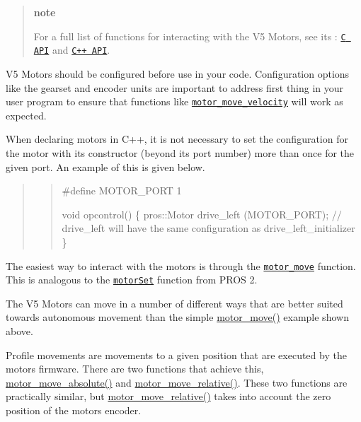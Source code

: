 \begin{quote}
{\bfseries note}

For a full list of functions for interacting with the V5 Motors, see its \+: \href{../../api/c/motors.html}{\tt C A\+PI} and \href{../../api/cpp/motors.html}{\tt C++ A\+PI}.

\end{quote}


V5 Motors should be configured before use in your code. Configuration options like the gearset and encoder units are important to address first thing in your user program to ensure that functions like \href{../../api/c/motors.html#motor-move-velocity}{\tt motor\+\_\+move\+\_\+velocity} will work as expected.

When declaring motors in C++, it is not necessary to set the configuration for the motor with its constructor (beyond its port number) more than once for the given port. An example of this is given below.

\begin{quote}
\begin{quote}

\begin{DoxyCode}
#define MOTOR\_PORT 1

void opcontrol() \{
  pros::Motor drive\_left (MOTOR\_PORT);
  // drive\_left will have the same configuration as drive\_left\_initializer
\}
\end{DoxyCode}
 \end{quote}
\end{quote}


The easiest way to interact with the motors is through the \href{../../api/c/motors.html#motor-move}{\tt motor\+\_\+move} function. This is analogous to the \href{../../../cortex/api/index.html#motorSet}{\tt motor\+Set} function from P\+R\+OS 2.

The V5 Motors can move in a number of different ways that are better suited towards autonomous movement than the simple {\ttfamily \hyperlink{motors_8h_a7da9bf1e229e50bfeeaecf026a6d0d08}{motor\+\_\+move()}} example shown above.

Profile movements are movements to a given position that are executed by the motor\textquotesingle{}s firmware. There are two functions that achieve this, {\ttfamily \hyperlink{motors_8h_ab70bf4937f1b5cefa15c11c15314c90e}{motor\+\_\+move\+\_\+absolute()}} and {\ttfamily \hyperlink{motors_8h_ab4c1ba35d69e8e9b49df0e848fa305d3}{motor\+\_\+move\+\_\+relative()}}. These two functions are practically similar, but {\ttfamily \hyperlink{motors_8h_ab4c1ba35d69e8e9b49df0e848fa305d3}{motor\+\_\+move\+\_\+relative()}} takes into account the zero position of the motor\textquotesingle{}s encoder.

